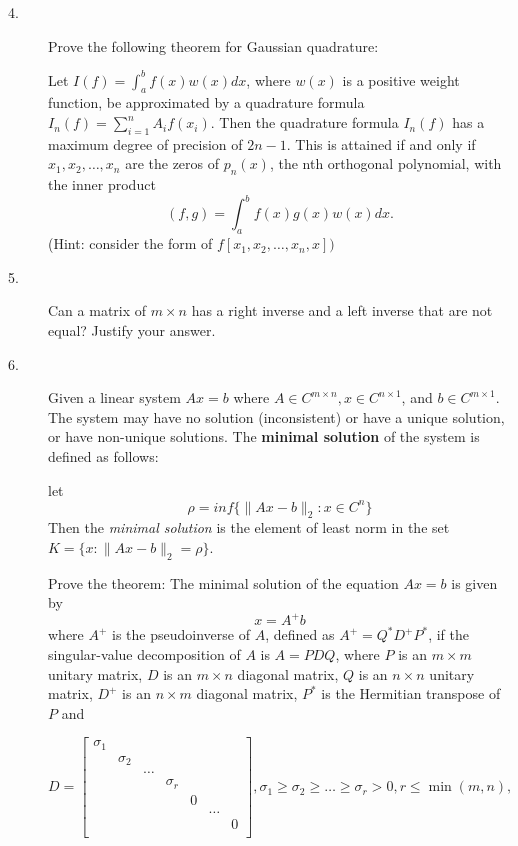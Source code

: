 \documentclass{article}
\begin{document}
\begin{description}
\item[4.]
Prove the following theorem for Gaussian quadrature:

Let $I(f) = \int^b_a f(x) w (x) dx$, where $w(x)$ is a positive weight
function, be approximated by a quadrature formula
$I_n(f) = \sum^n_{i=1} A_i f(x_i)$. Then the quadrature formula
$I_n(f)$ has a maximum degree of precision of $2n-1$. This is attained if
and only if $x_1, x_2, \dots, x_n$ are the zeros of $p_n(x)$, the nth
orthogonal polynomial, with the inner product
$$(f,g) = \int^b_a f(x) g(x) w(x) dx.$$
(Hint: consider the form of $f[x_1, x_2, \dots, x_n, x])$

\item[5.]
Can a matrix of $m \times n$ has a right inverse and a left inverse that are
not equal? Justify your answer.

\item[6.]
Given a linear system $Ax = b$ where
$A \in C^{m \times n}, x \in C^{n \times 1}$, and $b \in C^{m \times 1}$.
The system may have no solution (inconsistent) or have a unique solution,
or have non-unique solutions. The {\bf minimal solution} of the
system is defined as follows:

let
$$ \rho = inf \{\parallel Ax - b \parallel_2 : x \in C^n\}$$
Then the {\it minimal solution} is the element of least norm in the set
$K= \{x : \parallel Ax - b \parallel_2 = \rho\}$.

Prove the theorem: The minimal solution of the equation $Ax=b$ is given by
$$x = A^+b$$
where $A^+$ is the pseudoinverse of $A$, defined as $A^+ = Q^\ast D^+ P^\ast$,
if the singular-value decomposition of $A$ is $A = PDQ$, where $P$ is an
$m \times m$ unitary matrix, $D$ is an $m \times n$ diagonal matrix, $Q$
is an $n \times n$ unitary matrix, $D^+$ is an $n \times m$ diagonal
matrix, $P^\ast$ is the Hermitian transpose of $P$ and

$$D= \begin{bmatrix}
        \sigma_1 &&&&&& \\
        & \sigma_2 &&&&& \\
        && \dots &&&& \\
        &&& \sigma_r &&& \\
        &&&& 0 && \\
        &&&&& \dots & \\
        &&&&&& 0 \\
        \end{bmatrix},
  \sigma_1 \geq \sigma_2 \geq \dots \geq \sigma_r > 0, r \leq \min(m,n),$$


\end{description}
\end{document}
